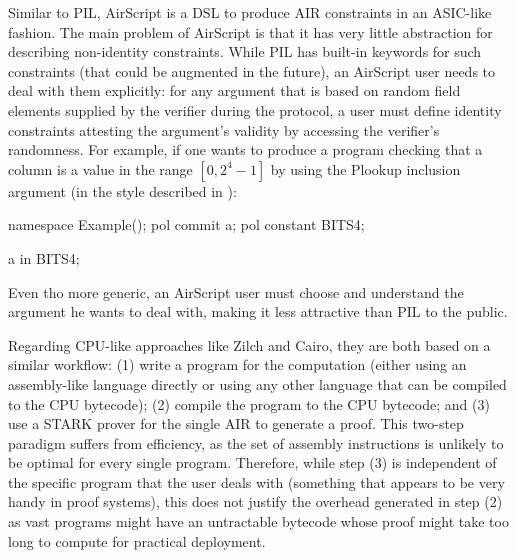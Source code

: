 Similar to PIL, AirScript is a DSL to produce AIR constraints in an ASIC-like fashion. The main problem of AirScript is that it has very little abstraction for describing non-identity constraints. While PIL has built-in keywords for such constraints (that could be augmented in the future), an AirScript user needs to deal with them explicitly: for any argument that is based on random field elements supplied by the verifier during the protocol, a user must define identity constraints attesting the argument's validity by accessing the verifier's randomness. For example, if one wants to produce a program checking that a column is a value in the range $[0,2^4-1]$ by using the Plookup \cite{EPRINT:GabWil20} inclusion argument (in the style described in \cite{EPRINT:PFMBM22}):
\begin{pil}
    namespace Example();
    pol commit a;
    pol constant BITS4;
    
    a in BITS4;
\end{pil}
Even tho more generic, an AirScript user must choose and understand the argument he wants to deal with, making it less attractive than PIL to the public. 

Regarding CPU-like approaches like Zilch and Cairo, they are both based on a similar workflow: (1) write a program for the computation (either using an assembly-like language directly or using any other language that can be compiled to the CPU bytecode); (2) compile the program to the CPU bytecode; and (3) use a STARK prover for the single AIR to generate a proof. This two-step paradigm suffers from efficiency, as the set of assembly instructions is unlikely to be optimal for every single program. Therefore, while step (3) is independent of the specific program that the user deals with (something that appears to be very handy in proof systems), this does not justify the overhead generated in step (2) as vast programs might have an untractable bytecode whose proof might take too long to compute for practical deployment.
